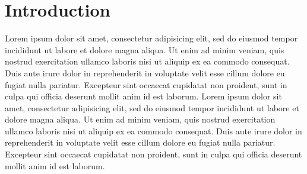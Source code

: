 
% 
% 
% 
% 
% 

\section{Introduction}

\begin{draft}
Lorem ipsum dolor sit amet, consectetur adipisicing elit, sed do eiusmod tempor incididunt ut labore et dolore magna aliqua. Ut enim ad minim veniam, quis nostrud exercitation ullamco laboris nisi ut aliquip ex ea commodo consequat. Duis aute irure dolor in reprehenderit in voluptate velit esse cillum dolore eu fugiat nulla pariatur. Excepteur sint occaecat cupidatat non proident, sunt in culpa qui officia deserunt mollit anim id est laborum.
Lorem ipsum dolor sit amet, consectetur adipisicing elit, sed do eiusmod tempor incididunt ut labore et dolore magna aliqua. Ut enim ad minim veniam, quis nostrud exercitation ullamco laboris nisi ut aliquip ex ea commodo consequat. Duis aute irure dolor in reprehenderit in voluptate velit esse cillum dolore eu fugiat nulla pariatur. Excepteur sint occaecat cupidatat non proident, sunt in culpa qui officia deserunt mollit anim id est laborum.
\end{draft}
